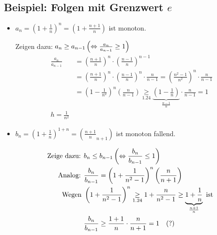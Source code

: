 \documentclass[10pt,a4paper]{article}
\begin{document}
    \subsection{Beispiel: Folgen mit Grenzwert $e$}
    \begin{itemize}
        \item $a_n = \left(1 + \frac{1}{n}\right)^n = \left(1 + \frac{n+1}{n}\right)$ ist monoton.
        
        Zeigen dazu: $a_n \geq a_{n-1} \left(\Leftrightarrow \frac{a_n}{a_{n-1}} \geq 1\right)$
        $$\begin{aligned}
            \frac{a_n}{a_{n-1}} &= \left(\frac{n+1}{n}\right)^n \cdot \left(\frac{n-1}{n}\right)^{n-1} \\
            &= \left(\frac{n+1}{n}\right)^n \cdot \left(\frac{n-1}{n}\right)^n \cdot \frac{n}{n-1}
            = \left(\frac{n^2-1}{n^2}\right)^n \cdot \frac{n}{n-1} \\
            &= \left(1 - \frac{1}{n^2}\right)^n \left(\frac{n}{n-1}\right) \underset{1.24}{\geq} \underbrace{\left(1 - \frac{1}{n}\right)}_{\frac{n - 1}{n}} \cdot \frac{n}{n-1} = 1 \\
            h = \frac{1}{n^2}
        \end{aligned}$$

        \item $b_n = \left(1 + \frac{1}{n}\right)^{1+n} = \left(\frac{n+1}{n}_{n+1}\right)$ ist monoton fallend.

        $$\begin{aligned}
            \text{Zeige dazu: }
            &b_n \leq b_{n-1} \left(\Leftrightarrow \frac{b_n}{b_{n-1}} \leq 1 \right) \\
            \text{Analog: }
            &\frac{b_n}{b_{n-1}} = \left(1 + \frac{1}{n^2-1}\right)^n \left(\frac{n}{n+1}\right) \\
            \text{Wegen } &\left(1 + \frac{1}{n^2-1}\right)^n \underset{1.24}{\geq} 1 + \frac{n}{n^2-1} 
            \geq \underbrace{1 + \frac{1}{n}}_{\frac{n+1}{n}} \text{ ist } \\
            &\frac{b_n}{b_{n-1}} \geq \frac{1+1}{n} \cdot \frac{n}{n+1} = 1 \quad (?)
        \end{aligned}$$
    \end{itemize}
\end{document}
